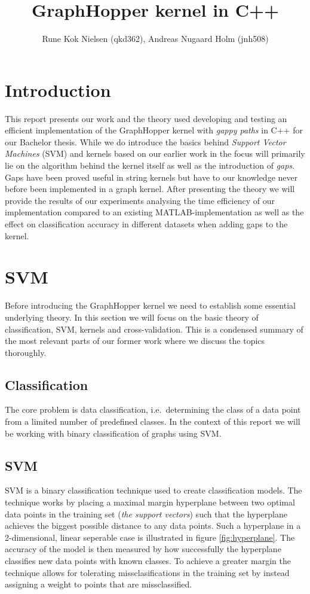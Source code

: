 \documentclass{article}
\author{Rune Kok Nielsen (qkd362), Andreas Nugaard Holm (jnh508)}
\title{GraphHopper kernel in C++}
\begin{document}
	
\maketitle
\newpage
\tableofcontents
\newpage

\section{Introduction}
This report presents our work and the theory used developing and testing an efficient implementation of the GraphHopper kernel\cite{gappy} with \textit{gappy paths} in C++ for our Bachelor thesis. While we do introduce the basics behind \textit{Support Vector Machines } (SVM) and kernels based on our earlier work in \cite{svm-graph-kernels} the focus will primarily lie on the algorithm behind the kernel itself as well as the introduction of \textit{gaps}. Gaps have been proved useful in string kernels but have to our knowledge never before been implemented in a graph kernel. After presenting the theory we will provide the results of our experiments analysing the time efficiency of our implementation compared to an existing MATLAB-implementation as well as the effect on classification accuracy in different datasets when adding gaps to the kernel.

\section{SVM}
Before introducing the GraphHopper kernel we need to establish some essential underlying theory. In this section we will focus on the basic theory of classification, SVM, kernels and cross-validation. This is a condensed summary of the most relevant parts of our former work \cite{svm-graph-kernels} where we discuss the topics thoroughly.

\subsection{Classification}
The core problem is data classification, i.e.\ determining the class of a data point from a limited number of predefined classes. In the context of this report we will be working with binary classification of graphs using SVM.

\subsection{SVM}
SVM is a binary classification technique used to create classification models. The technique works by placing a maximal margin hyperplane between two optimal data points in the training set (\textit{the support vectors}) such that the hyperplane achieves the biggest possible distance to any data points. Such a hyperplane in a 2-dimensional, linear seperable case is illustrated in figure \ref{fig:hyperplane}. The accuracy of the model is then measured by how successfully the hyperplane classifies new data points with known classes. To achieve a greater margin the technique allows for tolerating missclasifications in the training set by instead assigning a weight to points that are missclassified.
\end{document}
